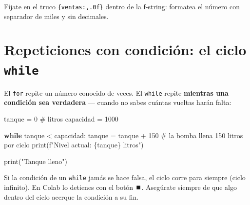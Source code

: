 \documentclass[
  spanish,
  letterpaper,
  DIV=11,
  numbers=noendperiod]{scrreprt}
\newenvironment{Shaded}{\begin{snugshade}}{\end{snugshade}}
\newcommand{\BuiltInTok}[1]{\textcolor[rgb]{0.00,0.23,0.31}{#1}}
\newcommand{\CommentTok}[1]{\textcolor[rgb]{0.37,0.37,0.37}{#1}}
\newcommand{\ControlFlowTok}[1]{\textcolor[rgb]{0.00,0.23,0.31}{\textbf{#1}}}
\newcommand{\DecValTok}[1]{\textcolor[rgb]{0.68,0.00,0.00}{#1}}
\newcommand{\NormalTok}[1]{\textcolor[rgb]{0.00,0.23,0.31}{#1}}
\newcommand{\OperatorTok}[1]{\textcolor[rgb]{0.37,0.37,0.37}{#1}}
\newcommand{\SpecialCharTok}[1]{\textcolor[rgb]{0.37,0.37,0.37}{#1}}
\newcommand{\SpecialStringTok}[1]{\textcolor[rgb]{0.13,0.47,0.30}{#1}}
\newcommand{\StringTok}[1]{\textcolor[rgb]{0.13,0.47,0.30}{#1}}
\begin{document}
Fíjate en el truco \texttt{\{ventas:,.0f\}} dentro de la f-string:
formatea el número con separador de miles y sin decimales.

\section{\texorpdfstring{Repeticiones con condición: el ciclo
\texttt{while}}{Repeticiones con condición: el ciclo while}}\label{repeticiones-con-condiciuxf3n-el-ciclo-while}

El \texttt{for} repite un número conocido de veces. El \texttt{while}
repite \textbf{mientras una condición sea verdadera} --- cuando no sabes
cuántas vueltas harán falta:

\begin{Shaded}
\begin{Highlighting}[]
\NormalTok{tanque }\OperatorTok{=} \DecValTok{0}      \CommentTok{\# litros}
\NormalTok{capacidad }\OperatorTok{=} \DecValTok{1000}

\ControlFlowTok{while}\NormalTok{ tanque }\OperatorTok{\textless{}}\NormalTok{ capacidad:}
\NormalTok{    tanque }\OperatorTok{=}\NormalTok{ tanque }\OperatorTok{+} \DecValTok{150}   \CommentTok{\# la bomba llena 150 litros por ciclo}
    \BuiltInTok{print}\NormalTok{(}\SpecialStringTok{f"Nivel actual: }\SpecialCharTok{\{}\NormalTok{tanque}\SpecialCharTok{\}}\SpecialStringTok{ litros"}\NormalTok{)}

\BuiltInTok{print}\NormalTok{(}\StringTok{"Tanque lleno"}\NormalTok{)}
\end{Highlighting}
\end{Shaded}

\begin{tcolorbox}[enhanced jigsaw, arc=.35mm, bottomrule=.15mm, bottomtitle=1mm, breakable, colback=white, colbacktitle=quarto-callout-warning-color!10!white, colframe=quarto-callout-warning-color-frame, coltitle=black, left=2mm, leftrule=.75mm, opacityback=0, opacitybacktitle=0.6, rightrule=.15mm, title=\textcolor{quarto-callout-warning-color}{\faExclamationTriangle}\hspace{0.5em}{Advertencia}, titlerule=0mm, toprule=.15mm, toptitle=1mm]

Si la condición de un \texttt{while} jamás se hace falsa, el ciclo corre
para siempre (ciclo infinito). En Colab lo detienes con el botón ⏹️.
Asegúrate siempre de que algo dentro del ciclo acerque la condición a su
fin.

\end{tcolorbox}
\end{document}
